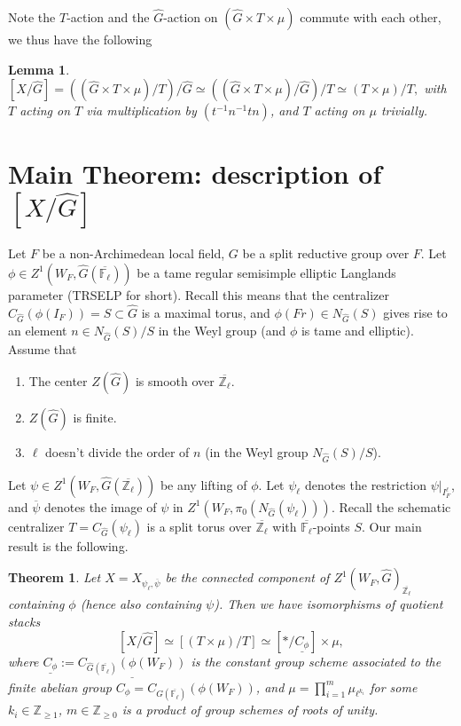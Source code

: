 \documentclass{article}
\newtheorem{theorem}{Theorem}
\newtheorem{lemma}{Lemma}
\begin{document}
	Note the $T$-action and the $\hat{G}$-action on $(\hat{G} \times T \times \mu)$ commute with each other, we thus have the following
	
	\begin{lemma}
		$[X/\hat{G}] = ((\hat{G} \times T \times \mu)/T)/\hat{G} \simeq ((\hat{G} \times T \times \mu)/\hat{G})/T \simeq (T \times \mu)/T, $ with $T$ acting on $T$ via multiplication by $(t^{-1}n^{-1}tn)$, and $T$ acting on $\mu$ trivially.
	\end{lemma}
	
	
	
	\section{Main Theorem: description of $[X/\hat{G}]$}
	Let $F$ be a non-Archimedean local field, $G$ be a split reductive group over $F$. Let $\phi \in Z^1(W_F, \hat{G}(\overline{\mathbb{F}_{\ell}}))$ be a tame regular semisimple elliptic Langlands parameter (TRSELP for short). Recall this means that the centralizer $C_{\hat{G}}(\phi(I_F))=S \subset \hat{G}$ is a maximal torus, and $\phi(Fr) \in N_{\hat{G}}(S)$ gives rise to an element $n \in N_{\hat{G}}(S)/S$ in the Weyl group (and $\phi$ is tame and elliptic). Assume that
	\begin{enumerate}
		\item The center $Z(\hat{G})$ is smooth over $\overline{\mathbb{Z}_{\ell}}.$
		\item $Z(\hat{G})$ is finite.
		\item $\ell$ doesn't divide the order of $n$ (in the Weyl group $N_{\hat{G}}(S)/S$). 
	\end{enumerate}
	Let $\psi \in Z^1(W_F, \hat{G}(\overline{\mathbb{Z}_{\ell}}))$ be any lifting of $\phi$. Let $\psi_{\ell}$ denotes the restriction $\psi|_{I_F^{\ell}}$, and $\overline{\psi}$ denotes the image of $\psi$ in $Z^1(W_F, \pi_0(N_{\hat{G}}(\psi_{\ell})))$. Recall the schematic centralizer $T=C_{\hat{G}}(\psi_{\ell})$ is a split torus over $\overline{\mathbb{Z}_{\ell}}$ with $\overline{\mathbb{F}_{\ell}}$-points $S$. Our main result is the following.
	
	\begin{theorem}
		Let $X=X_{\psi_{\ell}, \overline{\psi}}$ be the connected component of $Z^1(W_F, \hat{G})_{\overline{\mathbb{Z}_{\ell}}}$ containing $\phi$ (hence also containing $\psi$). Then we have isomorphisms of quotient stacks
		$$[X/\hat{G}] \simeq [(T \times \mu)/T] \simeq [*/\underline{C_{\phi}}] \times \mu,$$
		where $\underline{C_{\phi}}:=\underline{C_{\hat{G}(\overline{\mathbb{F}_{\ell}})}(\phi(W_F))}$ is the constant group scheme associated to the finite abelian group $C_{\phi}=C_{\hat{G}(\overline{\mathbb{F}_{\ell}})}(\phi(W_F))$, and $\mu=\prod_{i=1}^m\mu_{\ell^{k_i}}$ for some $k_i \in \mathbb{Z}_{\geq 1}$, $m \in \mathbb{Z}_{\geq 0}$ is a product of group schemes of roots of unity.
		
	\end{theorem}
	
\end{document}
